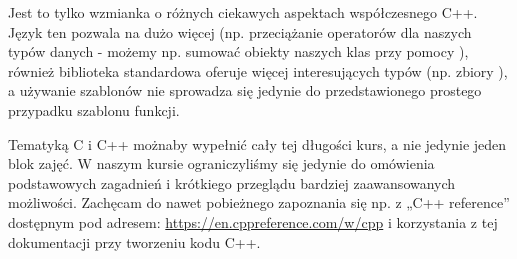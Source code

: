 Jest to tylko wzmianka o różnych ciekawych aspektach współczesnego C++. Język ten pozwala na dużo więcej (np. przeciążanie operatorów dla naszych typów danych - możemy np. sumować obiekty naszych klas przy pomocy \cpp{+}), również biblioteka standardowa oferuje więcej interesujących typów (np. zbiory ), a używanie szablonów nie sprowadza się jedynie do przedstawionego prostego przypadku szablonu funkcji.

Tematyką C i C++ możnaby wypełnić cały tej długości kurs, a nie jedynie jeden blok zajęć. W naszym kursie ograniczyliśmy się jedynie do omówienia podstawowych zagadnień i krótkiego przeglądu bardziej zaawansowanych możliwości. Zachęcam do nawet pobieżnego zapoznania się np. z „C++ reference” dostępnym pod adresem: \url{https://en.cppreference.com/w/cpp} i korzystania z tej dokumentacji przy tworzeniu kodu C++.
